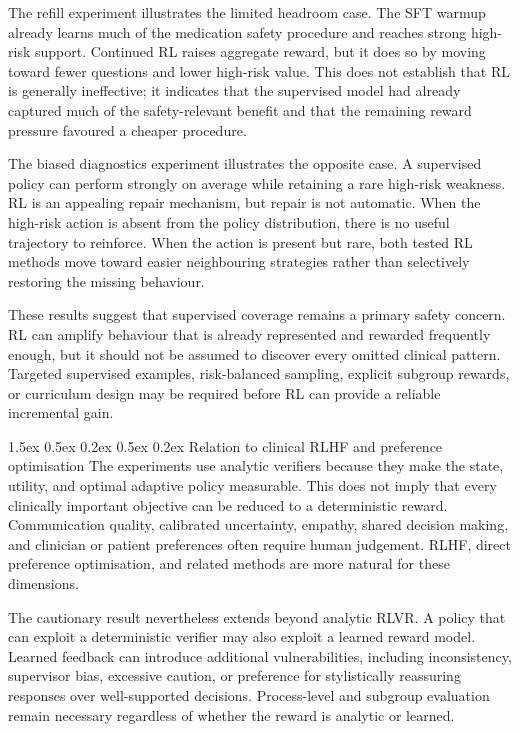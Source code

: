 \documentclass{article}
\makeatletter
\renewcommand{\paragraph}{%
  \@startsection{paragraph}{4}{\z@}%
                {1.5ex \@plus 0.5ex \@minus 0.2ex}%
                {0.5ex \@plus 0.2ex}%
                {\normalsize\bf}}
\makeatother
\begin{document}
The refill experiment illustrates the limited headroom case. The SFT warmup
already learns much of the medication safety procedure and reaches strong high-risk support. Continued RL raises aggregate reward, but it does so by moving toward
fewer questions and lower high-risk value. This does not establish that RL is
generally ineffective; it indicates that the supervised model had already captured
much of the safety-relevant benefit and that the remaining reward pressure favoured a
cheaper procedure.

The biased diagnostics experiment illustrates the opposite case. A supervised
policy can perform strongly on average while retaining a rare high-risk weakness.
RL is an appealing repair mechanism, but repair is not automatic. When the high-risk action is absent from the policy distribution, there is no useful trajectory
to reinforce. When the action is present but rare, both tested RL methods move
toward easier neighbouring strategies rather than selectively restoring the
missing behaviour.

These results suggest that supervised coverage remains a primary safety concern.
RL can amplify behaviour that is already represented and rewarded frequently
enough, but it should not be assumed to discover every omitted clinical pattern.
Targeted supervised examples, risk-balanced sampling, explicit subgroup rewards,
or curriculum design may be required before RL can provide a reliable incremental
gain.

\paragraph{Relation to clinical RLHF and preference optimisation}
The experiments use analytic verifiers because they make the state, utility, and
optimal adaptive policy measurable. This does not imply that every clinically
important objective can be reduced to a deterministic reward. Communication
quality, calibrated uncertainty, empathy, shared decision making, and clinician or
patient preferences often require human judgement. RLHF, direct preference
optimisation, and related methods are more natural for these dimensions.


The cautionary result nevertheless extends beyond analytic RLVR. A policy that can
exploit a deterministic verifier may also exploit a learned reward model. Learned
feedback can introduce additional vulnerabilities, including inconsistency,
supervisor bias, excessive caution, or preference for stylistically reassuring
responses over well-supported decisions. Process-level and subgroup evaluation
remain necessary regardless of whether the reward is analytic or learned.
\end{document}
